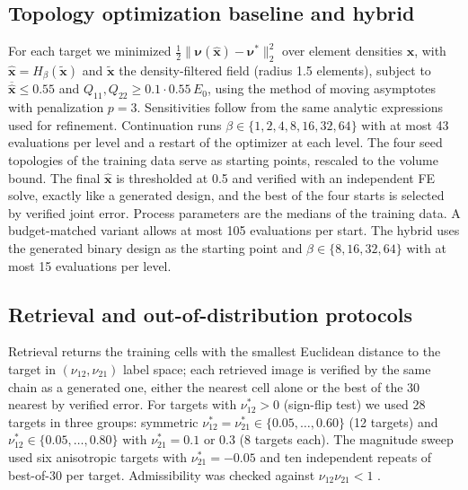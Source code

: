 \documentclass[a4paper,11pt]{article}
\newcommand{\nuot}{\nu_{12}}
\newcommand{\nuto}{\nu_{21}}
\begin{document}
\subsection{Topology optimization baseline and hybrid}
\label{sec:to}
For each target we minimized
$\tfrac12\lVert\boldsymbol\nu(\hat{\mathbf x})-\boldsymbol\nu^{*}\rVert_2^2$
over element densities $\mathbf x$, with $\hat{\mathbf x}=H_\beta(\tilde{\mathbf x})$
and $\tilde{\mathbf x}$ the density-filtered field (radius 1.5 elements),
subject to $\overline{\hat{\mathbf x}}\le0.55$ and $Q_{11},Q_{22}\ge0.1\cdot0.55\,E_0$,
using the method of moving asymptotes \citep{svanberg1987mma} with
penalization $p=3$. Sensitivities follow from the same analytic expressions
used for refinement. Continuation runs $\beta\in\{1,2,4,8,16,32,64\}$ with at
most 43 evaluations per level and a restart of the optimizer at each level.
The four seed topologies of the training data serve as starting points,
rescaled to the volume bound. The final $\hat{\mathbf x}$ is thresholded at
0.5 and verified with an independent FE solve, exactly like a generated
design, and the best of the four starts is selected by verified joint error.
Process parameters are the medians of the training data. A budget-matched
variant allows at most 105 evaluations per start. The hybrid uses the
generated binary design as the starting point and
$\beta\in\{8,16,32,64\}$ with at most 15 evaluations per level.

\subsection{Retrieval and out-of-distribution protocols}
Retrieval returns the training cells with the smallest Euclidean distance to
the target in $(\nuot,\nuto)$ label space; each retrieved image is verified
by the same chain as a generated one, either the nearest cell alone or the
best of the 30 nearest by verified error. For targets with $\nuot^{*}>0$
(sign-flip test) we used 28 targets in three groups: symmetric
$\nuot^{*}=\nuto^{*}\in\{0.05,\dots,0.60\}$ (12 targets) and
$\nuot^{*}\in\{0.05,\dots,0.80\}$ with $\nuto^{*}=0.1$ or $0.3$ (8 targets
each). The magnitude sweep used six anisotropic targets with
$\nuto^{*}=-0.05$ and ten independent repeats of best-of-30 per target.
Admissibility was checked against $\nuot\nuto<1$ \citep{lempriere1968poisson}.
\end{document}
